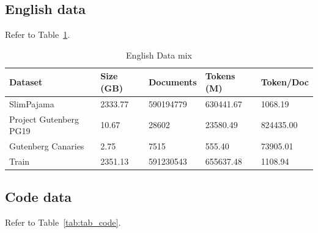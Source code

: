 \subsection{English data}

Refer to Table~\ref{tab:tab_en}.
\begin{table}
    \centering
\begin{tabular}{lllll}
    \toprule
    Dataset & Size (GB) & Documents & Tokens (M) & Token/Doc \\
    \midrule
    SlimPajama & 2333.77 & 590194779 & 630441.67 & 1068.19 \\
    Project Gutenberg PG19 & 10.67 & 28602 & 23580.49 & 824435.00 \\
    Gutenberg Canaries & 2.75 & 7515 & 555.40 & 73905.01 \\
    \midrule
    Train & 2351.13 & 591230543 & 655637.48 & 1108.94 \\
    \bottomrule
    \end{tabular}
    
    \caption[English data mix]{English Data mix}
    \label{tab:tab_en}
\end{table}


\subsection{Code data}
Refer to Table~\ref{tab:tab_code}.

